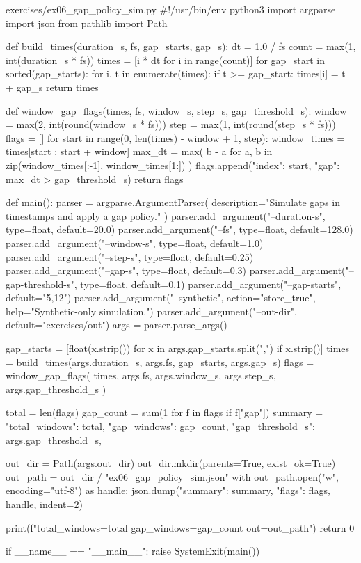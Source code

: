 \documentclass[11pt,openany]{book}
\begin{document}
\begin{filecontents*}{exercises/ex06_gap_policy_sim.py}
#!/usr/bin/env python3
import argparse
import json
from pathlib import Path


def build_times(duration_s, fs, gap_starts, gap_s):
    dt = 1.0 / fs
    count = max(1, int(duration_s * fs))
    times = [i * dt for i in range(count)]
    for gap_start in sorted(gap_starts):
        for i, t in enumerate(times):
            if t >= gap_start:
                times[i] = t + gap_s
    return times


def window_gap_flags(times, fs, window_s, step_s, gap_threshold_s):
    window = max(2, int(round(window_s * fs)))
    step = max(1, int(round(step_s * fs)))
    flags = []
    for start in range(0, len(times) - window + 1, step):
        window_times = times[start : start + window]
        max_dt = max(
            b - a for a, b in zip(window_times[:-1], window_times[1:])
        )
        flags.append({"index": start, "gap": max_dt > gap_threshold_s})
    return flags


def main():
    parser = argparse.ArgumentParser(
        description="Simulate gaps in timestamps and apply a gap policy."
    )
    parser.add_argument("--duration-s", type=float, default=20.0)
    parser.add_argument("--fs", type=float, default=128.0)
    parser.add_argument("--window-s", type=float, default=1.0)
    parser.add_argument("--step-s", type=float, default=0.25)
    parser.add_argument("--gap-s", type=float, default=0.3)
    parser.add_argument("--gap-threshold-s", type=float, default=0.1)
    parser.add_argument("--gap-starts", default="5,12")
    parser.add_argument("--synthetic", action="store_true", help="Synthetic-only simulation.")
    parser.add_argument("--out-dir", default="exercises/out")
    args = parser.parse_args()

    gap_starts = [float(x.strip()) for x in args.gap_starts.split(",") if x.strip()]
    times = build_times(args.duration_s, args.fs, gap_starts, args.gap_s)
    flags = window_gap_flags(
        times, args.fs, args.window_s, args.step_s, args.gap_threshold_s
    )

    total = len(flags)
    gap_count = sum(1 for f in flags if f["gap"])
    summary = {
        "total_windows": total,
        "gap_windows": gap_count,
        "gap_threshold_s": args.gap_threshold_s,
    }

    out_dir = Path(args.out_dir)
    out_dir.mkdir(parents=True, exist_ok=True)
    out_path = out_dir / "ex06_gap_policy_sim.json"
    with out_path.open("w", encoding="utf-8") as handle:
        json.dump({"summary": summary, "flags": flags}, handle, indent=2)

    print(f"total_windows={total} gap_windows={gap_count} out={out_path}")
    return 0


if __name__ == "__main__":
    raise SystemExit(main())
\end{filecontents*}
\end{document}
